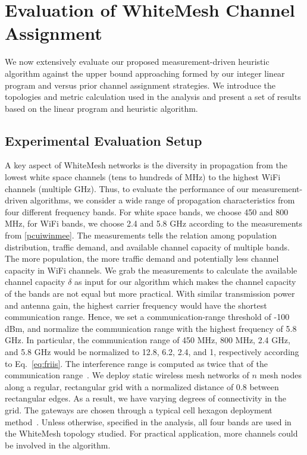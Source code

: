 \section{Evaluation of WhiteMesh Channel Assignment}
\label{sec:experimentdesign}


We now extensively evaluate our proposed measurement-driven heuristic algorithm against the upper 
bound approaching formed by our integer linear program and versus prior channel 
assignment strategies. We introduce the topologies and metric calculation used 
in the analysis and present a set of results based on the linear program and heuristic algorithm.

\subsection{Experimental Evaluation Setup}
\label{subsec:design}
A key aspect of WhiteMesh networks is the diversity in propagation from the lowest white
space channels (tens to hundreds of MHz) to the highest WiFi channels (multiple GHz). Thus, 
to evaluate the performance of our measurement-driven algorithms, we consider a wide range 
of propagation characteristics from four different frequency bands.  For white space bands, 
we choose 450 and 800 MHz, for WiFi bands, we choose 2.4 and 5.8 GHz according to the measurements
from \ref{pcuiwinmee}. The measurements tells the relation among population distribution, traffic demand,
and available channel capacity of multiple bands. The more population, the more traffic demand
and potentially less channel capacity in WiFi channels. We grab the measurements to calculate
the available channel capacity $\delta$ as input for our algorithm which makes the channel 
capacity of the bands are not equal but more practical. With similar transmission
power and antenna gain, the highest carrier frequency would have the shortest communication range.
Hence, we set a communication-range threshold of -100 dBm, and normalize the communication 
range with the highest frequency of 5.8 GHz. In particular, the communication range of 
450 MHz, 800 MHz, 2.4 GHz, and 5.8 GHz would be normalized to 12.8, 6.2, 2.4, and 1, respectively 
according to Eq.~\ref{eq:friis}. The interference range is computed as twice that of the communication 
range~\cite{raniwala2005architecture}. We deploy static wireless mesh networks of $n$ 
mesh nodes along a regular, rectangular grid with a normalized distance of 0.8 between rectangular edges. 
As a result, we have varying degrees of connectivity in the grid.
The gateways are chosen through a typical cell hexagon deployment method~\cite{meguerdichian2001exposure}.
Unless otherwise, specified in the analysis, all four bands are used in the WhiteMesh
topology studied. For practical application, more channels could be involved in the 
algorithm.


